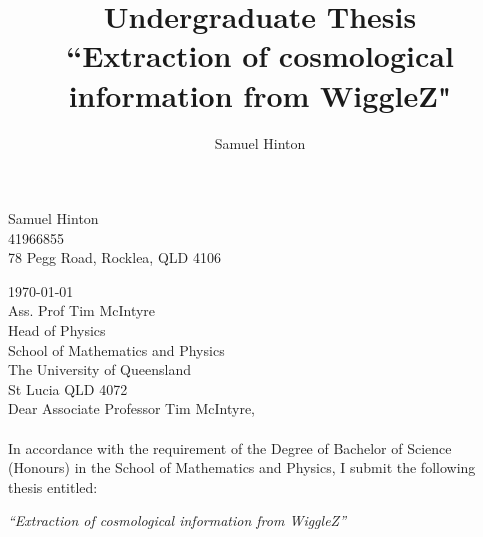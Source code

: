 \documentclass[titlesmallcaps, examinerscopy, copyrightpage]{uqthesis}
\begin{document}

\hypersetup{pageanchor=true}

\title{Undergraduate Thesis\\ \vspace{0.5 cm} ``Extraction of cosmological information from WiggleZ" }
\author{Samuel Hinton}

\renewcommand{\degreetext}{in partial fulfilment of the Bachelor of Science (Honours) degree\\ in the
discipline of Physics}

\frontmatter

\titlepage




\begin{flushright}
Samuel Hinton\\ 41966855\\ 78 Pegg Road, Rocklea, QLD 4106\\
\end{flushright}

\noindent \today \\

\noindent Ass. Prof Tim McIntyre\\
Head of Physics\\
School of Mathematics and Physics\\
The University of  Queensland\\
St Lucia QLD 4072\\

\noindent Dear Associate Professor Tim McIntyre,\\ \\
In accordance with the requirement of the Degree of Bachelor of Science (Honours) in the School of Mathematics and Physics, I submit the following thesis entitled:

\begin{center}
  \emph{``Extraction of cosmological information from WiggleZ''}
\end{center}
\end{document}
